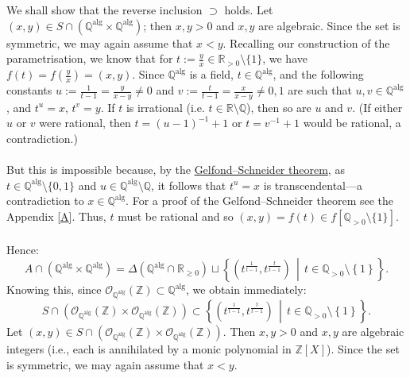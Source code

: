 \documentclass[11pt, a4paper, oneside]{article}
\theoremstyle{remark}
\theoremstyle{lemma}
\begin{document}
We shall show that the reverse inclusion \( \supset \) holds. Let \( (x, y) \in S \cap \left( \mathbb{Q}^{\mathrm{alg}} \times \mathbb{Q}^{\mathrm{alg}} \right) \); then \( x, y > 0 \) and \( x, y \) are algebraic. Since the set is symmetric, we may again assume that \( x < y \). Recalling our construction of the parametrisation, we know that for \( t := \frac{y}{x} \in \mathbb{R}_{>0} \setminus \{1\} \), we have \( f(t) = f\left( \frac{y}{x} \right) = (x, y) \). Since \( \mathbb{Q}^{\mathrm{alg}} \) is a field, \( t \in \mathbb{Q}^{\mathrm{alg}} \), and the following constants \( u := \frac{1}{t - 1} = \frac{y}{x - y} \neq 0 \) and \( v := \frac{t}{t - 1} = \frac{x}{x - y} \neq 0,1 \) are such that \( u, v \in \mathbb{Q}^{\mathrm{alg}} \), and \( t^{u} = x \), \( t^{v} = y \). If \( t \) is irrational (i.e. \( t \in \mathbb{R} \setminus \mathbb{Q} \)), then so are \( u \) and \( v \). (If either \( u \) or \( v \) were rational, then \( t = (u - 1)^{-1} + 1 \) or \( t = v^{-1} + 1 \) would be rational, a contradiction.)
\\\\
But this is impossible because, by the \href{https://en.wikipedia.org/wiki/Gelfond–Schneider_theorem}{Gelfond–Schneider theorem}, as \( t \in \mathbb{Q}^{\mathrm{alg}} \setminus \{0,1\} \) and \( u \in \mathbb{Q}^{\mathrm{alg}} \setminus \mathbb{Q} \), it follows that \( t^{u} = x \) is transcendental—a contradiction to \( x \in \mathbb{Q}^{\mathrm{alg}} \). For a proof of the Gelfond–Schneider theorem see the Appendix [\hyperref[A]{A}]. Thus, \( t \) must be rational and so \( (x, y) = f(t) \in f\left[ \mathbb{Q}_{>0} \setminus \{1\} \right] \).
\\\\
Hence:
\[
A \cap \left( \mathbb{Q}^{\mathrm{alg}} \times \mathbb{Q}^{\mathrm{alg}} \right) = \Delta\left( \mathbb{Q}^{\mathrm{alg}} \cap \mathbb{R}_{\geq 0} \right) \sqcup \left\{ \left( t^{\frac{1}{t - 1}}, t^{\frac{t}{t - 1}} \right) \,\middle|\, t \in \mathbb{Q}_{>0} \setminus \left\{ 1 \right\} \right\}.
\]
Knowing this, since \( \mathcal{O}_{\mathbb{Q}^{\mathrm{alg}}}(\mathbb{Z}) \subset \mathbb{Q}^{\mathrm{alg}} \), we obtain immediately:
\[
S \cap \left( \mathcal{O}_{\mathbb{Q}^{\mathrm{alg}}}(\mathbb{Z}) \times \mathcal{O}_{\mathbb{Q}^{\mathrm{alg}}}(\mathbb{Z}) \right) \subset \left\{ \left( t^{\frac{1}{t - 1}}, t^{\frac{t}{t - 1}} \right) \,\middle|\, t \in \mathbb{Q}_{>0} \setminus \left\{ 1 \right\} \right\}.
\]
Let \( (x,y) \in S \cap \left( \mathcal{O}_{\mathbb{Q}^{\mathrm{alg}}}(\mathbb{Z}) \times \mathcal{O}_{\mathbb{Q}^{\mathrm{alg}}}(\mathbb{Z}) \right) \). Then \( x,y > 0 \) and \( x,y \) are algebraic integers (i.e., each is annihilated by a monic polynomial in \( \mathbb{Z}[X] \)). Since the set is symmetric, we may again assume that \( x < y \).
\end{document}
